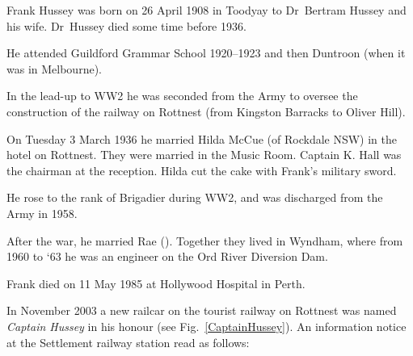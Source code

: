 
Frank Hussey was born on 26 April 1908 in Toodyay\cite{RaeWestAus} to Dr~Bertram Hussey and his wife.\cite{WesternMail1936}
Dr~Hussey died some time before 1936.\cite{MilitaryWedding}

He attended Guildford Grammar School 1920--1923\cite{FBHguildford}
and then Duntroon (when it was in Melbourne).\cite{RaeWestAus}

In the lead-up to WW2 he was seconded from the Army to oversee the construction of the railway on Rottnest (from Kingston Barracks to Oliver Hill).\cite{RaeWestAus}

On Tuesday 3 March 1936 he married Hilda McCue (of Rockdale NSW\cite{WestAus1936p4})
in the hotel on Rottnest.\cite{WestAus1936p19}
They were married in the Music Room.\cite{MilitaryWedding}
Captain K. Hall was the chairman at the reception.\cite{MilitaryWedding}
Hilda cut the cake with Frank's military sword.\cite{MilitaryWedding}

He rose to the rank of Brigadier during WW2,\cite{FBHwar}
and was discharged from the Army in 1958.\cite{CaptainHusseyDisplay}

After the war, he married Rae (). Together they lived in Wyndham,
where from 1960 to `63 he was an engineer on the Ord River Diversion Dam.

Frank died on 11 May 1985 at Hollywood Hospital in Perth.

In November 2003 a new railcar on the tourist railway on Rottnest was named \emph{Captain Hussey} in his honour (see Fig.~\ref{CaptainHussey}).\cite{RIA2004}
An information notice at the Settlement railway station read as follows:\cite{CaptainHusseyDisplay}

